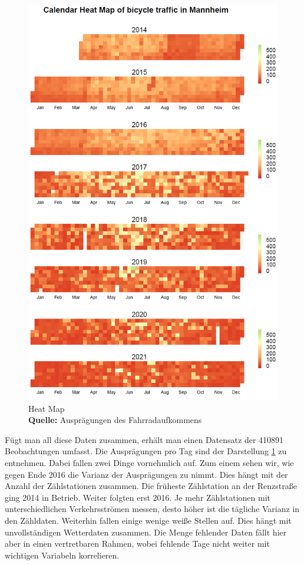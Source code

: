 \documentclass[a4paper,12pt]{thesis}
\newcommand*{\captionsource}[2]{%
	\caption[{#1}]{%
		#1%
		\\\hspace{\linewidth}%
		\textbf{Quelle:} #2%
	}%
}
\begin{document}
\begin{figure}[!ht]
	\centering
	\includegraphics[width=\textwidth]{Plots/CalendarHeatMap.png}
	\captionsource{Heat Map}{
		Ausprägungen des Fahrradaufkommens
	}
	\label{fig:calendarheatmap}
\end{figure}

Fügt man all diese Daten zusammen, erhält man einen Datensatz der 410891 Beobachtungen umfasst. Die Ausprägungen pro Tag sind der Darstellung \ref{fig:calendarheatmap} zu entnehmen. Dabei fallen zwei Dinge vornehmlich auf. Zum einem sehen wir, wie gegen Ende 2016 die Varianz der Ausprägungen zu nimmt. Dies hängt mit der Anzahl der Zählstationen zusammen. Die früheste Zählstation an der Renzstraße ging 2014 in Betrieb. Weiter folgten erst 2016. Je mehr Zählstationen mit unterschiedlichen Verkehrsströmen messen, desto höher ist die tägliche Varianz in den Zähldaten. Weiterhin fallen einige wenige weiße Stellen auf. Dies hängt mit unvollständigen Wetterdaten zusammen. Die Menge fehlender Daten fällt hier aber in einen vertretbaren Rahmen, wobei fehlende Tage nicht weiter mit wichtigen Variabeln korrelieren.
\end{document}
